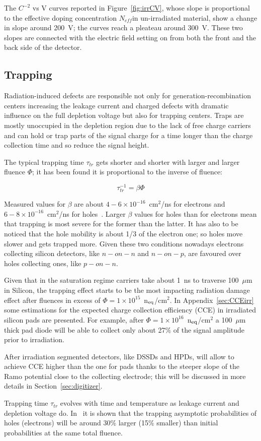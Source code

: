  The $C^{-2}$ vs V curves reported in Figure~\ref{fig:irrCV}, whose slope is proportional to the 
 effective doping concentration $N_{eff}$in un-irradiated material, show a change in slope around 
 200~V; the curves reach a pleateau around 300~V. These two slopes are connected with the 
 electric field setting on from both the front and the back side of the detector.


\subsection{Trapping}
\label{sec:trapping}
Radiation-induced defects are responsible not only for generation-recombination centers increasing 
the leakage current and charged defects with dramatic influence on the full depletion voltage but 
also for trapping centers. Traps are mostly unoccupied in the depletion region due to the lack of free 
charge carriers and can hold or trap parts of the signal charge for a time longer than the charge 
collection time and so reduce the signal height. 

The typical trapping time $\tau_{tr}$ gets shorter and shorter with larger and larger fluence $\Phi$; it 
has 
been found it is proportional to the inverse of fluence:

\begin{equation}
\tau_{tr}^{-1}=\beta\Phi
\label{eq:trappingtime}
\end{equation}

Measured values for $\beta$ are about $4-6\times10^{-16}$~cm$^2$/ns for electrons 
and $6-8\times10^{-16}$~cm$^2$/ns for holes~\cite{KRAMBERGER2002297}. Larger $\beta$ 
values for holes than for electrons mean that trapping is most severe for the former than the latter. 
It has also to be noticed that the hole mobility is about 1/3 of the electron one; so holes move 
slower and gets trapped more. Given these two conditions nowadays electrons collecting 
silicon detectors, like $n-on-n$ and $n-on-p$, are favoured over holes collecting ones, like
 $p-on-n$.  

Given that in the saturation regime carriers take about 1~ns to traverse 100~$\mu$m in Silicon, 
the trapping effect starts to be the most impacting radiation damage effect after fluences in excess of $
\Phi=1\times10^{15}$~n$_{\rm eq}$/cm$^2$. In Appendix~\ref{sec:CCEirr} some estimations 
for the expected charge collection efficiency (CCE) in irradiated silicon pads are presented. 
For example, after  $\Phi=1\times10^{16}$~n$_{\rm eq}$/cm$^2$ a 100~$\mu$m thick pad diode 
will be able to collect only about 27\% of the signal amplitude prior to irradiation.

After irradiation segmented detectors, like DSSDs and HPDs, will allow to achieve CCE higher than 
the one for pads thanks to the steeper slope of the Ramo potential close to the collecting electrode; 
this will be discussed in more details in Section~\ref{sec:digitizer}.

Trapping time $\tau_{tr}$ evolves with time and temperature as leakage current and depletion voltage 
do. In~\cite{KRAMBERGER2007762} it is shown that the trapping asymptotic probabilities  of
holes (electrons) will be around 30\% larger (15\% smaller)
than initial probabilities at the same total fluence.

   
